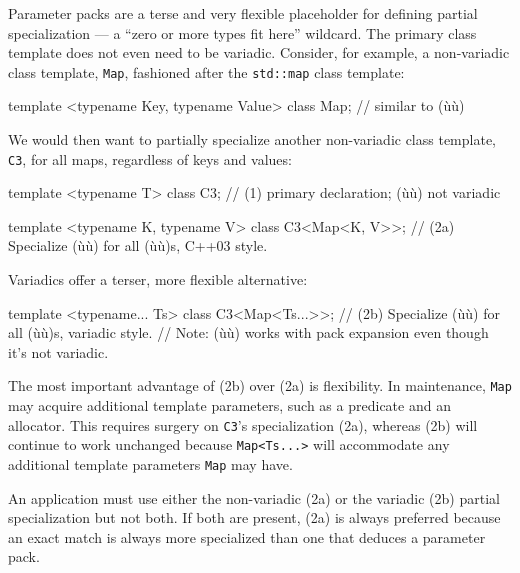 \noindent Parameter packs are a terse and very flexible placeholder for defining
partial specialization --- a ``zero or more types fit here'' wildcard.
The primary class template does not even need to be variadic. Consider,
for example, a non-variadic class template, \lstinline!Map!, fashioned
after the \lstinline!std::map! class template:

\begin{emcppslisting}[emcppsbatch=e11]
template <typename Key, typename Value> class Map;  // similar to (ù{}ù)
\end{emcppslisting}
    

\noindent We would then want to partially specialize another non-variadic class
template, \lstinline!C3!, for all maps, regardless of keys and values:

\begin{emcppslisting}[emcppsbatch=e11]
template <typename T> class C3;  // (1) primary declaration; (ù{}ù) not variadic

template <typename K, typename V>
class C3<Map<K, V>>;
    // (2a) Specialize (ù{}ù) for all (ù{}ù)s, C++03 style.
\end{emcppslisting}
    

\noindent Variadics offer a terser, more flexible alternative:

\begin{emcppslisting}[emcppsbatch=e11]
template <typename... Ts>
class C3<Map<Ts...>>;
    // (2b) Specialize (ù{}ù) for all (ù{}ù)s, variadic style.
    // Note: (ù{}ù) works with pack expansion even though it's not variadic.
\end{emcppslisting}
    

\noindent The most important advantage of (2b) over (2a) is flexibility. In
maintenance, \lstinline!Map! may acquire additional template parameters,
such as a predicate and an allocator. This requires surgery on
\lstinline!C3!'s specialization (2a), whereas (2b) will continue to work
unchanged because \lstinline!Map<Ts...>! will accommodate any additional
template parameters \lstinline!Map! may have.

An application must use either the non-variadic (2a) or the variadic
(2b) partial specialization but not both. If both are present, (2a) is
always preferred because an exact match is always more specialized than
one that deduces a parameter pack.

